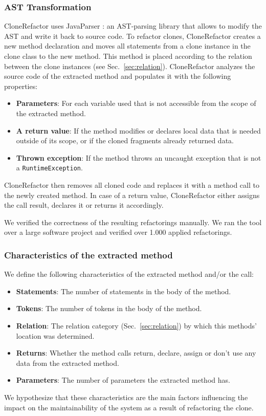 \documentclass[sigconf,review]{acmart}
\begin{document}
\subsubsection{AST Transformation}
CloneRefactor uses JavaParser \cite{tomassetti2017javaparser}: an AST-parsing library that allows to modify the AST and write it back to source code. To refactor clones, CloneRefactor creates a new method declaration and moves all statements from a clone instance in the clone class to the new method. This method is placed according to the relation between the clone instances (see Sec.~\ref{sec:relation}). CloneRefactor analyzes the source code of the extracted method and populates it with the following properties:
\begin{itemize}
  \item \textbf{Parameters}: For each variable used that is not accessible from the scope of the extracted method.
  \item \textbf{A return value}: If the method modifies or declares local data that is needed outside of its scope, or if the cloned fragments already returned data.
  \item \textbf{Thrown exception}: If the method throws an uncaught exception that is not a \texttt{RuntimeException}.
\end{itemize}
CloneRefactor then removes all cloned code and replaces it with a method call to the newly created method. In case of a return value, CloneRefactor either assigns the call result, declares it or returns it accordingly.

We verified the correctness of the resulting refactorings manually. We ran the tool over a large software project and verified over 1.000 applied refactorings.

\subsubsection{Characteristics of the extracted method}
We define the following characteristics of the extracted method and/or the call:
\begin{itemize}
\item \textbf{Statements}: The number of statements in the body of the method.
\item \textbf{Tokens}: The number of tokens in the body of the method.
\item \textbf{Relation}: The relation category (Sec.~\ref{sec:relation}) by which this methods' location was determined.
\item \textbf{Returns}: Whether the method calls return, declare, assign or don't use any data from the extracted method.
\item \textbf{Parameters}: The number of parameters the extracted method has.
\end{itemize}
We hypothesize that these characteristics are the main factors influencing the impact on the maintainability of the system as a result of refactoring the clone.
\end{document}
